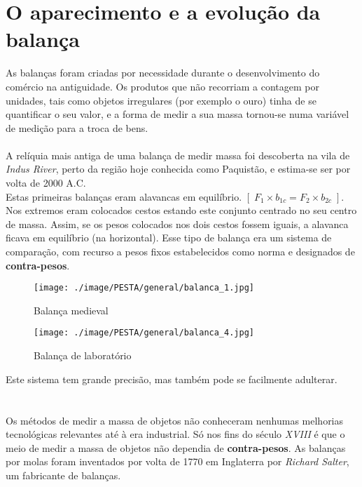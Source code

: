 \section{O aparecimento e a evolução da balança}
As balanças foram criadas por necessidade durante o desenvolvimento do comércio na antiguidade. Os produtos que não recorriam a contagem por unidades, tais como objetos irregulares (por exemplo o ouro) tinha de se quantificar o seu valor, e a forma de medir a sua massa tornou-se numa variável de medição para a troca de bens.
\\
\\
A relíquia mais antiga de uma balança de medir massa foi descoberta na vila de \textit{Indus River}, perto da região hoje conhecida como Paquistão, e estima-se ser por volta de 2000 A.C.
\\
Estas primeiras balanças eram alavancas em equilíbrio. $[ \; F_{1} \times b_{1c} = F_{2} \times b_{2c} \; ]$. Nos extremos eram colocados cestos estando este conjunto centrado no seu centro de massa. Assim, se os pesos colocados nos dois cestos fossem iguais, a alavanca ficava em equilíbrio (na horizontal). Esse tipo de balança era um sistema de comparação, com recurso a pesos fixos estabelecidos como norma e designados de \textbf{contra-pesos}.
\\
\begin{minipage}[!b]{0.5\linewidth}
	\begin{figure}[H]
		\flushleft
		\texttt{[image: ./image/PESTA/general/balanca\_1.jpg]}
		\caption{Balança medieval}
		\label{balanca_1}
	\end{figure}
\end{minipage}
\hspace{1cm}
\begin{minipage}[!b]{0.5\linewidth}
	\begin{figure}[H]
		\centering
		\texttt{[image: ./image/PESTA/general/balanca\_4.jpg]}
		\caption{Balança de laboratório}
		\label{balanca_4}
	\end{figure}
\end{minipage}
\newline
\newline
\newline
Este sistema tem grande precisão, mas também pode se facilmente adulterar.
\\
\\
\\
Os métodos de medir a massa de objetos não conheceram nenhumas melhorias tecnológicas relevantes até à era industrial. Só nos fins do século \textit{XVIII} é que o meio de medir a massa de objetos não dependia de \textbf{contra-pesos}. As balanças por molas foram inventados por volta de 1770 em Inglaterra por \textit{Richard Salter}, um fabricante de balanças.

